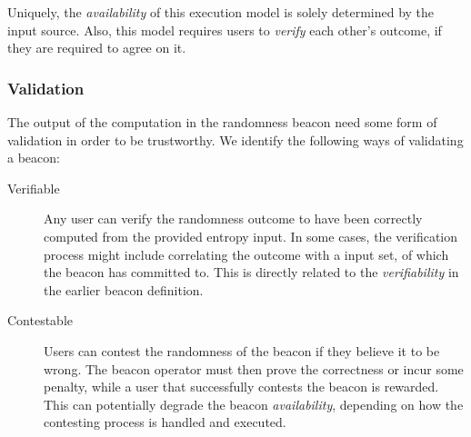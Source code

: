 \begin{description}
        Uniquely, the \emph{availability} of this execution model is solely determined by the input source.
        Also, this model requires users to \emph{verify} each other's outcome, if they are required to agree on it.

\end{description}

\subsubsection{Validation}
The output of the computation in the randomness beacon need some form of validation in order to be trustworthy.
We identify the following ways of validating a beacon:

\begin{description}
    \item[Verifiable]
        Any user can verify the randomness outcome  to have been correctly computed from the provided entropy input.
        In some cases, the verification process might include correlating the outcome with a input set, of which the beacon has committed to.
        This is directly related to the \emph{verifiability} in the earlier beacon definition.

    \item[Contestable]
        Users can contest the randomness  of the beacon if they believe it to be wrong.
        The beacon operator must then prove the correctness or incur some penalty, while a user that successfully contests the beacon is rewarded. 
        This can potentially degrade the beacon \emph{availability}, depending on how the contesting process is handled and executed.
\end{description}



